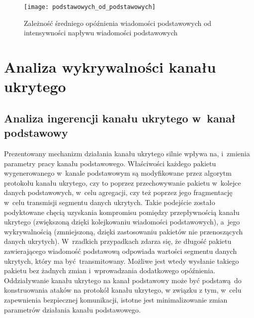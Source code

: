 \documentclass[a4paper, twoside, 12pt]{report}
\begin{document}
        \begin{figure}[h]
                \centering
                \texttt{[image: podstawowych\_od\_podstawowych]}
                \caption{Zależność średniego opóźnienia wiadomości podstawowych od
                    intensywności napływu wiadomości podstawowych}
                \label{OPOZNIENIEPODSTAWOWYCHODPODSTAWOWYCH}
        \end{figure}

\chapter{Analiza wykrywalności kanału ukrytego}
    \section{Analiza ingerencji kanału ukrytego w~kanał podstawowy}
        Prezentowany mechanizm działania kanału ukrytego silnie wpływa na, i~zmienia
        parametry pracy kanału podstawowego. Właściwości każdego pakietu wygenerowanego
        w~kanale podstawowym są modyfikowane przez algorytm protokołu kanału ukrytego,
        czy to poprzez przechowywanie pakietu w~kolejce danych podstawowych, w~celu
        agregacji, czy też
        poprzez jego fragmentację w~celu transmisji segmentu danych ukrytych. Takie podejście
        zostało podyktowane chęcią uzyskania kompromisu pomiędzy przepływnością
        kanału ukrytego (zwiększoną dzięki kolejkowaniu wiadomości podstawowych),
        a~jego wykrywalnością (zmniejszoną, dzięki zastosowaniu pakietów nie przenoszących danych ukrytych).
        W~rzadkich
        przypadkach zdarza się, że długość pakietu zawierającego wiadomość podstawową
        odpowiada wartości segmentu danych ukrytych, który ma być transmitowany.
        Możliwe jest wtedy wysłanie takiego pakietu bez żadnych zmian i~wprowadzania
        dodatkowego opóźnienia. Oddziaływanie kanału ukrytego na kanał podstawowy
        może być podstawą do konstruowania ataków na protokół kanału ukrytego, w
        związku z tym, w~celu zapewnienia bezpiecznej komunikacji, istotne jest
        minimalizowanie zmian parametrów działania kanału podstawowego.
\end{document}
